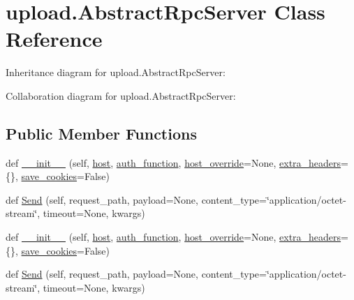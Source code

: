 \hypertarget{classupload_1_1_abstract_rpc_server}{}\section{upload.\+Abstract\+Rpc\+Server Class Reference}
\label{classupload_1_1_abstract_rpc_server}


Inheritance diagram for upload.\+Abstract\+Rpc\+Server\+:


Collaboration diagram for upload.\+Abstract\+Rpc\+Server\+:
\subsection*{Public Member Functions}
\begin{DoxyCompactItemize}
\item 
def \hyperlink{classupload_1_1_abstract_rpc_server_a3f6bc1bd16b52bd5a5c33a1fedeef2d0}{\+\_\+\+\_\+init\+\_\+\+\_\+} (self, \hyperlink{classupload_1_1_abstract_rpc_server_ab7188d827e2faddcf970f524f5856192}{host}, \hyperlink{classupload_1_1_abstract_rpc_server_aee0090a3bcf07b913a7dd596a5dabb8f}{auth\+\_\+function}, \hyperlink{classupload_1_1_abstract_rpc_server_a783a4a7e4ffb776a57a3f267300a213b}{host\+\_\+override}=None, \hyperlink{classupload_1_1_abstract_rpc_server_adbbf0109afc13d58d7815fa143cb779f}{extra\+\_\+headers}=\{\}, \hyperlink{classupload_1_1_abstract_rpc_server_affe342205c4647d41b127f5a5634858b}{save\+\_\+cookies}=False)
\item 
def \hyperlink{classupload_1_1_abstract_rpc_server_ac1b913f8bd00da4741c47ab49ea94cb5}{Send} (self, request\+\_\+path, payload=None, content\+\_\+type=\char`\"{}application/octet-\/stream\char`\"{}, timeout=None, kwargs)
\item 
def \hyperlink{classupload_1_1_abstract_rpc_server_a3f6bc1bd16b52bd5a5c33a1fedeef2d0}{\+\_\+\+\_\+init\+\_\+\+\_\+} (self, \hyperlink{classupload_1_1_abstract_rpc_server_ab7188d827e2faddcf970f524f5856192}{host}, \hyperlink{classupload_1_1_abstract_rpc_server_aee0090a3bcf07b913a7dd596a5dabb8f}{auth\+\_\+function}, \hyperlink{classupload_1_1_abstract_rpc_server_a783a4a7e4ffb776a57a3f267300a213b}{host\+\_\+override}=None, \hyperlink{classupload_1_1_abstract_rpc_server_adbbf0109afc13d58d7815fa143cb779f}{extra\+\_\+headers}=\{\}, \hyperlink{classupload_1_1_abstract_rpc_server_affe342205c4647d41b127f5a5634858b}{save\+\_\+cookies}=False)
\item 
def \hyperlink{classupload_1_1_abstract_rpc_server_ac1b913f8bd00da4741c47ab49ea94cb5}{Send} (self, request\+\_\+path, payload=None, content\+\_\+type=\char`\"{}application/octet-\/stream\char`\"{}, timeout=None, kwargs)
\end{DoxyCompactItemize}

